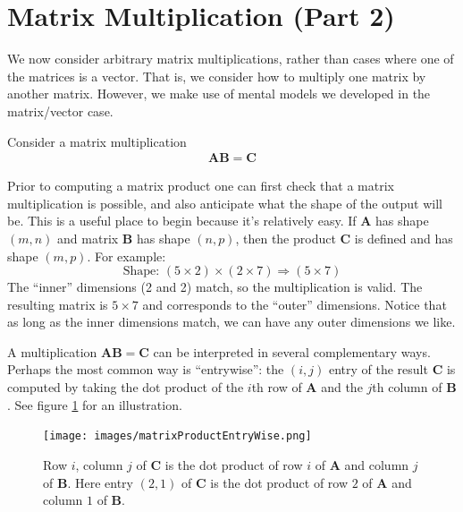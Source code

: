 \section{Matrix Multiplication (Part 2)}\label{matrixMultiplication}


We now consider arbitrary matrix multiplications, rather than cases where one of the matrices is a vector. That is, we consider how to multiply one matrix by another matrix. However, we make use of mental models we developed in the matrix/vector case.

Consider a matrix multiplication 
\begin{align*}
\mathbf{A}\mathbf{B} = \mathbf{C}
\end{align*}

Prior to computing a matrix product one can first check that a matrix multiplication is possible, and also anticipate what the shape of the output will be. This is a useful place to begin because it's relatively easy. If $\mathbf{A}$ has shape $(m, n)$ and matrix $\mathbf{B}$ has shape $(n, p)$, then the product $\mathbf{C}$ is defined and has shape $(m, p)$. For example: 
\[
\text{Shape: } (5 \times 2) \times (2 \times 7) \Rightarrow (5 \times 7)
\]
The ``inner'' dimensions (2 and 2) match, so the multiplication is valid. The resulting matrix is $5 \times 7$ and corresponds to the ``outer'' dimensions. Notice that as long as the inner dimensions match, we can have any outer dimensions we like. 

A multiplication $\mathbf{A}\mathbf{B} = \mathbf{C}$ can be interpreted in several complementary ways. Perhaps the most common way is ``entrywise'': the $(i,j)$ entry of the result $\mathbf{C}$ is computed by taking the dot product of the $i$th row of $\mathbf{A}$ and the $j$th column of $\mathbf{B}$. See figure \ref{entryWiseMatrixProduct} for an illustration. 

\begin{figure}[h]
\centering
\texttt{[image: images/matrixProductEntryWise.png]}
\caption[Jeff Yoshimi.]{Row $i$, column $j$ of $\mathbf{C}$ is the dot product of row $i$ of $\mathbf{A}$ and column $j$ of $\mathbf{B}$. Here entry $(2,1)$ of $\mathbf{C}$ is the dot product of row $2$ of $\mathbf{A}$ and column $1$ of $\mathbf{B}$.}
\label{entryWiseMatrixProduct}
\end{figure}

